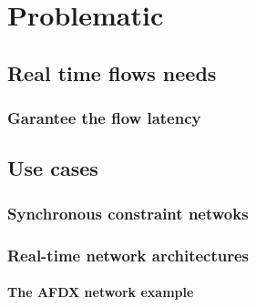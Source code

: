 

\chapter{Problematic}
\minitoc

\section{Real time flows needs}

\subsection{Garantee the flow latency}

\section{Use cases}

\subsection{Synchronous constraint netwoks}

\subsection{Real-time network architectures}

\subsubsection{The AFDX network example}

